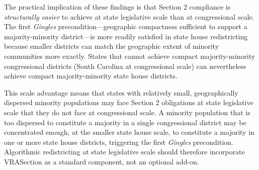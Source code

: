 The practical implication of these findings is that Section 2 compliance is \textit{structurally easier} to achieve at state legislative scale than at congressional scale. The first \textit{Gingles} precondition---geographic compactness sufficient to support a majority-minority district---is more readily satisfied in state house redistricting because smaller districts can match the geographic extent of minority communities more exactly. States that cannot achieve compact majority-minority congressional districts (South Carolina at congressional scale) can nevertheless achieve compact majority-minority state house districts.

This scale advantage means that states with relatively small, geographically dispersed minority populations may face Section 2 obligations at state legislative scale that they do not face at congressional scale. A minority population that is too dispersed to constitute a majority in a single congressional district may be concentrated enough, at the smaller state house scale, to constitute a majority in one or more state house districts, triggering the first \textit{Gingles} precondition. Algorithmic redistricting at state legislative scale should therefore incorporate VRASection as a standard component, not an optional add-on.
